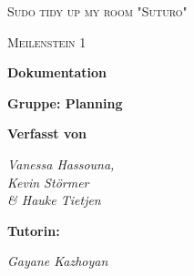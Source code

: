 \documentclass[12pt,a4paper]{report}
\begin{document}
\begin{titlepage}
	\centering
	{\scshape\LARGE Sudo tidy up my room "Suturo" \par}
	\vspace{1.5cm}
	{\scshape\Large Meilenstein 1\par}
	\vspace{1.5cm}
	{\huge\bfseries Dokumentation \par}
	\vspace{0.5cm}
	{\LARGE\bfseries Gruppe: Planning \par}	
	\vspace{2.5cm}
	{\normalsize\bfseries Verfasst von \par}
	{\small\itshape Vanessa Hassouna, \\ Kevin St\"ormer \\  \& Hauke Tietjen\par}	
	\vspace{2.5cm}
	{\normalsize\bfseries Tutorin: \par}
	{\small\itshape Gayane Kazhoyan\par}


	\vfill
\end{titlepage}
\end{document}
